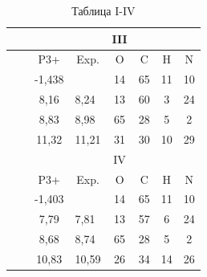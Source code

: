 \documentclass[a4paper,fleqn]{cas-dc}
\begin{document}
    \begin{table}[t]
        \caption{Таблица I-IV}
        \begin{tabular}{@{}cccccccc@{}}
        \toprule

    &  &        &                           & III  &    &    &    \\ \midrule
    &  & P3+    & Exp.                      & O             & C  & H  & N  \\ \midrule
    &  & -1,438 &                           & 14            & 65 & 11 & 10 \\ \midrule
    &  & 8,16   & \multicolumn{1}{l}{8,24}  & 13            & 60 & 3  & 24 \\ \midrule
    &  & 8,83   & \multicolumn{1}{l}{8,98}  & 65            & 28 & 5  & 2  \\ \midrule
    &  & 11,32  & \multicolumn{1}{l}{11,21} & 31            & 30 & 10 & 29 \\ \midrule
    &  &        &                           & IV &    &    &    \\ \midrule
    &  & P3+    & Exp.                      & O             & C  & H  & N  \\ \midrule
    &  & -1,403 &                           & 14            & 65 & 11 & 10 \\ \midrule
    &  & 7,79   & \multicolumn{1}{l}{7,81}  & 13            & 57 & 6  & 24 \\ \midrule
    &  & 8,68   & \multicolumn{1}{l}{8,74}  & 65            & 28 & 5  & 2  \\ \midrule
    &  & 10,83  & \multicolumn{1}{l}{10,59} & 26            & 34 & 14 & 26 \\ \bottomrule

\end{tabular}
\end{table}
\end{document}
